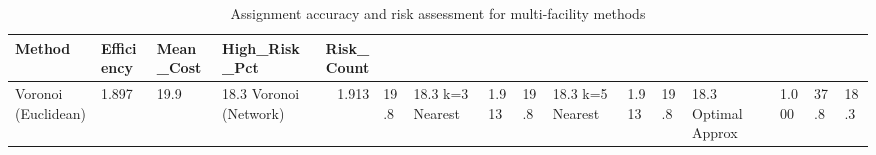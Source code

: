 \begin{table}
\caption{Assignment accuracy and risk assessment for multi-facility methods}
\label{tab:multifacility_accuracy}
\begin{tabular}{llllr}
\toprule
Method & Efficiency & Mean_Cost & High_Risk_Pct & Risk_Count \\
\midrule
Voronoi (Euclidean) & 1.897 & 19.9 & 18.3%
Voronoi (Network) & 1.913 & 19.8 & 18.3%
k=3 Nearest & 1.913 & 19.8 & 18.3%
k=5 Nearest & 1.913 & 19.8 & 18.3%
Optimal Approx & 1.000 & 37.8 & 18.3%
\bottomrule
\end{tabular}
\end{table}
